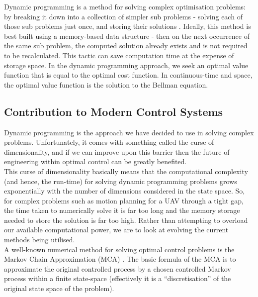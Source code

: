 \documentclass[11pt,draftd]{article}
\begin{document}
Dynamic programming is a method for solving complex optimisation problems: by breaking it down into a collection of simpler sub problems - solving each of those sub problems just once, and storing their solutions \cite{wikiDyn}. Ideally, this method is best built using a memory-based data structure - then on the next occurrence of the same sub problem, the computed solution already exists and is not required to be recalculated. This tactic can save computation time at the expense of storage space. In the dynamic programming approach, we seek an optimal value function that is equal to the optimal cost function. In continuous-time and space, the optimal value function is the solution to the Bellman equation.\\

\subsection{Contribution to Modern Control Systems}
Dynamic programming is the approach we have decided to use in solving complex problems. Unfortunately, it comes with something called the curse of dimensionality, and if we can improve upon this barrier then the future of engineering within optimal control can be greatly benefited. \\

This curse of dimensionality basically means that the computational complexity (and hence, the run-time) for solving dynamic programming problems grows exponentially with the number of dimensions considered in the state space. So, for complex problems such as motion planning for a UAV through a tight gap, the time taken to numerically solve it is far too long and the memory storage needed to store the solution is far too high. Rather than attempting to overload our available computational power, we are to look at evolving the current methods being utilised. \\

A well-known numerical method for solving optimal control problems is the Markov Chain Approximation (MCA) \cite{kushner}. The basic formula of the MCA is to approximate the original controlled process by a chosen controlled Markov process within a finite state-space (effectively it is a “discretisation” of the original state space of the problem). \\
\end{document}
